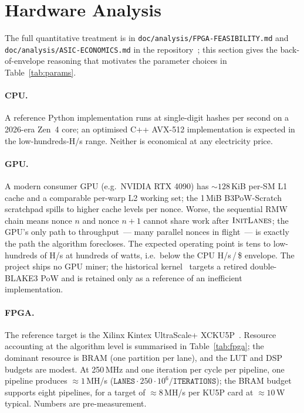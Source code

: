 \documentclass[11pt,a4paper]{article}
\theoremstyle{plain}
\theoremstyle{definition}
\theoremstyle{remark}
\begin{document}
\section{Hardware Analysis}\label{sec:hardware}

The full quantitative treatment is in
\texttt{doc/analysis/FPGA-FEASIBILITY.md} and
\texttt{doc/analysis/ASIC-ECONOMICS.md} in the
repository~\cite{b3chain-fpga,b3chain-asic}; this section gives the
back-of-envelope reasoning that motivates the parameter choices in
Table~\ref{tab:params}.

\paragraph{CPU.}
A reference Python implementation runs at single-digit hashes per
second on a 2026-era Zen~4 core; an optimised C++ AVX-512
implementation is expected in the low-hundreds-H/s range. Neither
is economical at any electricity price.

\paragraph{GPU.}
A modern consumer GPU (e.g.~NVIDIA RTX 4090) has $\sim 128$\,KiB
per-SM L1 cache and a comparable per-warp L2 working set; the
1\,MiB B3PoW-Scratch scratchpad spills to higher cache levels per
nonce. Worse, the sequential RMW chain means nonce $n$ and nonce
$n{+}1$ cannot share work after $\textsc{InitLanes}$; the GPU's only
path to throughput~--- many parallel nonces in flight~--- is exactly
the path the algorithm forecloses. The expected operating point is
tens to low-hundreds of H/s at hundreds of watts, i.e.~below the
CPU H/s\,/\,\$ envelope. The project ships no GPU miner; the
historical kernel~\cite{b3chain-gpuminer} targets a retired
double-BLAKE3 PoW and is retained only as a reference of an
inefficient implementation.

\paragraph{FPGA.}
The reference target is the Xilinx Kintex UltraScale+
XCKU5P~\cite{xilinx-ku5p}. Resource accounting at the algorithm
level is summarised in Table~\ref{tab:fpga}; the dominant resource
is BRAM (one partition per lane), and the LUT and DSP budgets are
modest. At 250\,MHz and one iteration per cycle per pipeline, one
pipeline produces $\approx 1$\,MH/s
($\texttt{LANES} \cdot 250\cdot 10^6 / \texttt{ITERATIONS}$); the
BRAM budget supports eight pipelines, for a target of
$\approx 8$\,MH/s per KU5P card at $\approx 10$\,W typical. Numbers
are pre-measurement.
\end{document}
